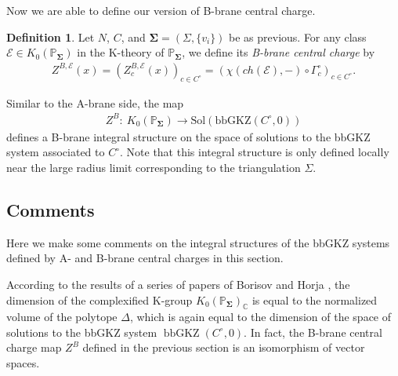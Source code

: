 \documentclass[11pt,reqno]{amsart}
\def\CC {{\mathbb C}}
\def\PP {{\mathbb P}}
\theoremstyle{definition}
\newtheorem{definition}[theorem]{Definition}
\numberwithin{equation}{section}
\begin{document}
Now we are able to define our version of B-brane central charge.

\smallskip

\begin{definition}\label{B-brane central charge}
	Let $N$, $C$, and $\mathbf{\Sigma}=(\Sigma,\{v_i\})$ be as previous. For any class $\mathcal{E}\in K_0(\PP_{\mathbf{\Sigma}})$ in the K-theory of $\PP_{\mathbf{\Sigma}}$, we define its \textit{B-brane central charge} by
	\begin{align*}
		Z^{B,\mathcal{E}}(x)=(Z^{B,\mathcal{E}}_c(x))_{c\in C^{\circ}}=(\chi(ch(\mathcal{E}),-)\circ \Gamma^{\circ}_c)_{c\in C^{\circ}}.
	\end{align*}
\end{definition}

\smallskip

Similar to the A-brane side, the map
\begin{align*}
	Z^B:\ K_0(\PP_{\mathbf{\Sigma}}) \rightarrow \mathrm{Sol}(\mathrm{bbGKZ}(C^{\circ},0))
\end{align*}
defines a B-brane integral structure on the space of solutions to the bbGKZ system associated to $C^{\circ}$. Note that this integral structure is only defined locally near the large radius limit corresponding to the triangulation $\Sigma$.

\subsection{Comments}\label{issues}

Here we make some comments on the integral structures of the bbGKZ systems defined by A- and B-brane central charges in this section.

According to the results of a series of papers of Borisov and Horja \cite{BHconj,BH,MellinBarnes}, the dimension of the complexified K-group $K_0(\PP_{\mathbf{\Sigma}})_{\CC}$ is equal to the normalized volume of the polytope $\Delta$, which is again equal to the dimension of the space of solutions to the bbGKZ system $\operatorname{bbGKZ}(C^{\circ},0)$. In fact, the B-brane central charge map $Z^B$ defined in the previous section is an isomorphism of vector spaces.
\end{document}
